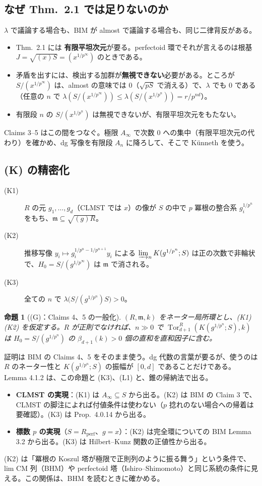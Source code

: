 \documentclass[11pt,a4paper]{ltjsarticle}
\theoremstyle{plain}
\theoremstyle{definition}
\theoremstyle{remark}
\theoremstyle{plain}
\newtheorem*{proposition*}{命題}
\newcommand{\m}{\mathfrak{m}}
\newcommand{\Tor}{\operatorname{Tor}}
\begin{document}
\subsection{なぜ Thm.~2.1 では足りないのか}
$\lambda$ で議論する場合も、BIM が almost で議論する場合も、同じ二律背反がある。
\begin{itemize}
  \item Thm.~2.1 には \textbf{有限平坦次元}が要る。perfectoid 環でそれが言えるのは根基 $J = \sqrt{(x)S} = (x^{1/p^\infty})$ のときである。
  \item 矛盾を出すには、検出する加群が\textbf{無視できない}必要がある。ところが $S/(x^{1/p^\infty})$ は、almost の意味では $0$（$\sqrt{pS}$ で消える）で、$\lambda$ でも $0$ である（任意の $n$ で $\lambda(S/(x^{1/p^\infty}))\le\lambda(S/(x^{1/p^n})) = r/p^{nd}$）。
  \item 有限段 $n$ の $S/(x^{1/p^n})$ は無視できないが、有限平坦次元をもたない。
\end{itemize}
Claims 3--5 はこの間をつなぐ。極限 $A_\infty$ で次数 $0$ への集中（有限平坦次元の代わり）を確かめ、dg 写像を有限段 $A_n$ に降ろして、そこで Künneth を使う。

\subsection{(K) の精密化}
\begin{description}
  \item[(K1)] $R$ の元 $g_1,\dots,g_d$（CLMST では $x$）の像が $S$ の中で $p$ 冪根の整合系 $g_i^{1/p^n}$ をもち、$\m\subseteq\sqrt{(g)R}$。
  \item[(K2)] 推移写像 $y_i\mapsto g_i^{1/p^n-1/p^{n+1}}y_i$ による $\varinjlim_nK(g^{1/p^n};S)$ は正の次数で非輪状で、$H_0 = S/(g^{1/p^\infty})$ は $\m$ で消される。
  \item[(K3)] 全ての $n$ で $\lambda\bigl(S/(g^{1/p^n})S\bigr)>0$。
\end{description}
\begin{proposition*}[(G)：Claims 4、5 の一般化]
$(R,\m,k)$ をネーター局所環とし、(K1)(K2) を仮定する。$R$ が正則でなければ、$n\gg0$ で $\Tor^R_{d+1}(K(g^{1/p^n};S),k)$ は $H_0 = S/(g^{1/p^n})$ の $\beta_{d+1}(k)>0$ 個の直和を直和因子に含む。
\end{proposition*}
証明は BIM の Claims 4、5 をそのまま使う。dg 代数の言葉が要るが、使うのは $R$ のネーター性と $K(g^{1/p^n};S)$ の振幅が $[0,d]$ であることだけである。Lemma 4.1.2 は、この命題と (K3)、(L1) と、錐の帰納法で出る。
\begin{itemize}
  \item \textbf{CLMST の実現}：(K1) は $A_\infty\subseteq S$ から出る。(K2) は BIM の Claim 3 で、CLMST の脚注によれば付値条件は使わない（$p$ 捻れのない場合への帰着は要確認）。(K3) は Prop.~4.0.14 から出る。
  \item \textbf{標数 $p$ の実現}（$S = R_{\mathrm{perf}}$、$g = x$）：(K2) は完全環についての BIM Lemma 3.2 から出る。(K3) は Hilbert--Kunz 関数の正値性から出る。
\end{itemize}
(K2) は「冪根の Koszul 塔が極限で正則列のように振る舞う」という条件で、lim CM 列（BHM）や perfectoid 塔（Ishiro--Shimomoto）と同じ系統の条件に見える。この関係は、BHM を読むときに確かめる。
\end{document}
